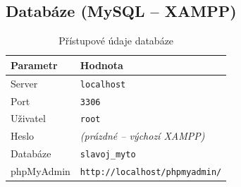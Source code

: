 \documentclass[12pt,a4paper]{article}
\begin{document}
\subsection*{Databáze (MySQL -- XAMPP)}

\begin{table}[H]
\centering
\begin{tabular}{ll}
\toprule
\textbf{Parametr} & \textbf{Hodnota} \\
\midrule
Server & \texttt{localhost} \\
Port & \texttt{3306} \\
Uživatel & \texttt{root} \\
Heslo & \textit{(prázdné -- výchozí XAMPP)} \\
Databáze & \texttt{slavoj\_myto} \\
phpMyAdmin & \texttt{http://localhost/phpmyadmin/} \\
\bottomrule
\end{tabular}
\caption{Přístupové údaje databáze}
\end{table}
\end{document}
